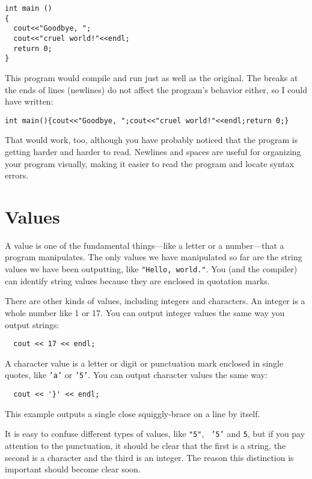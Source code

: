 \begin{verbatim}
int main ()
{
  cout<<"Goodbye, ";
  cout<<"cruel world!"<<endl;
  return 0;
}
\end{verbatim}
%
This program would compile and run just as well as the original.
The breaks at the ends of lines (newlines) do not affect
the program's behavior either, so I could have written:

\begin{verbatim}
int main(){cout<<"Goodbye, ";cout<<"cruel world!"<<endl;return 0;}
\end{verbatim}
%
That would work, too, although you have probably noticed that
the program is getting harder and harder to read.  Newlines and
spaces are useful for organizing your program visually, making
it easier to read the program and locate syntax errors.

\section{Values}

A value is one of the fundamental things---like a letter or
a number---that a program manipulates.  The only values we have
manipulated so far are the string values we have been outputting, like
{\tt "Hello, world."}.  You (and the compiler) can identify
string values because they are enclosed in quotation marks.

There are other kinds of values, including integers and characters.
An integer is a whole number like 1 or 17.  You can output
integer values the same way you output strings:

\begin{verbatim}
  cout << 17 << endl;
\end{verbatim}
%
A character value is a letter or digit or punctuation mark
enclosed in single quotes, like {\tt 'a'} or {\tt '5'}.
You can output character values the same way:

\begin{verbatim}
  cout << '}' << endl;
\end{verbatim}
%
This example outputs a single close squiggly-brace on a line
by itself.

It is easy to confuse different types of values, like {\tt "5"}, {\tt
'5'} and {\tt 5}, but if you pay attention to the punctuation, it
should be clear that the first is a string, the second is a character
and the third is an integer.  The reason this distinction is important
should become clear soon.

